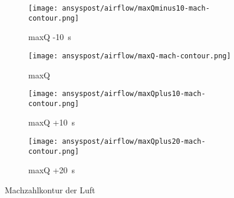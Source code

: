 \begin{figure}[H]
    \centering

    \begin{subfigure}{\textwidth}
        \centering
        \texttt{[image: ansyspost/airflow/maxQminus10-mach-contour.png]}
        \caption{maxQ -\SI{10}{\second}}
        \label{fig:maxQminus10_mach_contour}
    \end{subfigure}

    \begin{subfigure}{\textwidth}
        \centering
        \texttt{[image: ansyspost/airflow/maxQ-mach-contour.png]}
        \caption{maxQ}
        \label{fig:maxQ_mach_contour}
    \end{subfigure}

    \begin{subfigure}{\textwidth}
        \centering
        \texttt{[image: ansyspost/airflow/maxQplus10-mach-contour.png]}
        \caption{maxQ +\SI{10}{\second}}
        \label{fig:maxQplus10_mach_contour}
    \end{subfigure}

    \begin{subfigure}{\textwidth}
        \centering
        \texttt{[image: ansyspost/airflow/maxQplus20-mach-contour.png]}
        \caption{maxQ +\SI{20}{\second}}
        \label{fig:maxQplus20_mach_contour}
    \end{subfigure}

    \caption{Machzahlkontur der Luft}
    \label{fig:airflow_mach_contour}
\end{figure}
